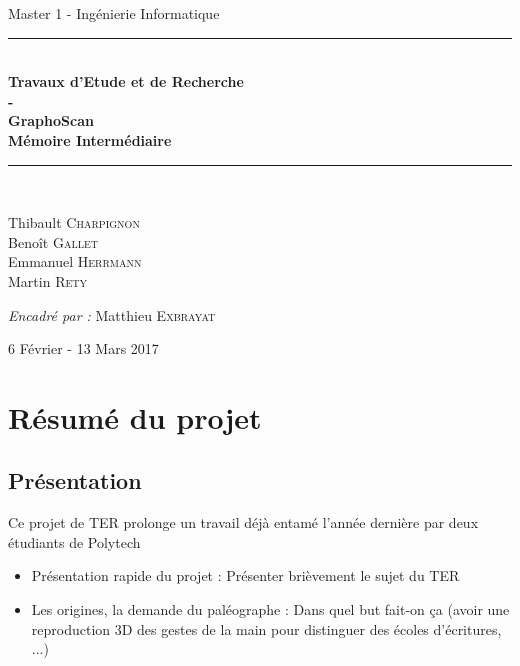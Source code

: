 \documentclass{article}
\begin{document}
\begin{center}
{\large Master 1 - Ingénierie Informatique} \\ [0.5cm]
\vfill
\rule{\linewidth}{0.4mm} \\ [0.4cm]
{\huge \bfseries
Travaux d'Etude et de Recherche\\
- \\
GraphoScan \\ [0.4cm]
Mémoire Intermédiaire \\ [0.4cm]
}
\rule{\linewidth}{0.4mm} \\ [1.5cm]

\begin{minipage}{0.4\textwidth}
\begin{flushleft} \large
Thibault \textsc{Charpignon} \\
Benoît \textsc{Gallet} \\
Emmanuel \textsc{Herrmann} \\
Martin \textsc{Rety}
\end{flushleft}
\end{minipage}

\vfill

\large\emph{Encadré par : }{Matthieu \textsc{Exbrayat}}

\vfill


{\large 6 Février - 13 Mars 2017}

\end{center}

\newpage
 
\tableofcontents

\newpage
 
\section{Résumé du projet}

\subsection{Présentation}

Ce projet de TER prolonge un travail déjà entamé l'année dernière par deux étudiants de Polytech

\begin{itemize}
\item Présentation rapide du projet : Présenter brièvement le sujet du TER
\item Les origines, la demande du paléographe : Dans quel but fait-on ça (avoir une reproduction 3D des gestes de la main pour distinguer des écoles d'écritures, ...)
\end{itemize}
\end{document}
